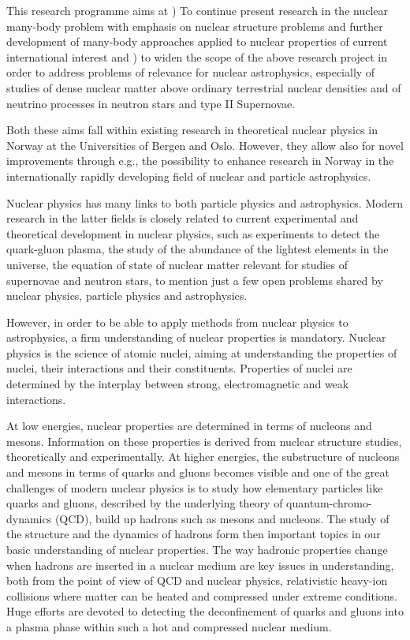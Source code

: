 This research programme aims at ) To continue present research in the nuclear many-body
problem with emphasis on nuclear structure problems
and further development of many-body approaches applied to nuclear
properties of current international interest
and ) to widen the scope of the above research project
in order to address 
problems of relevance for nuclear astrophysics, especially
of studies of dense nuclear matter above ordinary terrestrial 
nuclear densities and of neutrino processes in 
neutron stars and type II Supernovae. 

Both these aims fall within existing research in
theoretical nuclear physics in Norway at the Universities
of Bergen and Oslo. However, they allow also for novel  improvements
through e.g., the possibility
to  enhance 
research in Norway in the internationally rapidly 
developing field of nuclear and particle astrophysics.


Nuclear physics has many links to both particle physics
and astrophysics. 
Modern research in the latter fields is closely related
to current experimental and theoretical development
in nuclear physics, such as experiments to detect
the quark-gluon plasma, the study of the abundance of the 
lightest elements in the universe, the equation
of state of nuclear matter relevant for studies of supernovae
and neutron stars, to mention just a few open problems
shared by nuclear physics, particle physics and astrophysics.

However, in order to be able to apply 
methods from nuclear physics to astrophysics,
a firm understanding of nuclear properties is mandatory.
Nuclear physics is the science of atomic nuclei, aiming
at understanding the properties of nuclei, 
their interactions and 
their constituents. Properties of nuclei are determined
by the interplay between strong, electromagnetic and
weak interactions.

At low energies, nuclear properties are determined  
in terms of nucleons and mesons. Information on these
properties is derived from nuclear structure studies,
theoretically and experimentally. At higher energies,
the substructure of nucleons and mesons in terms of
quarks and gluons becomes visible and one of the great
challenges
of modern nuclear physics is to study how elementary particles
like quarks and gluons, described by the  underlying theory
of quantum-chromo-dynamics (QCD), build up hadrons such as mesons
and nucleons. The study of the structure and the 
dynamics of hadrons form then important topics in our basic
understanding of nuclear properties. The way hadronic 
properties change when hadrons are inserted in a nuclear
medium are key issues in understanding, both from
the point of view of QCD and nuclear physics, relativistic
heavy-ion collisions where matter can be heated and 
compressed under extreme conditions. Huge efforts are devoted to
detecting the deconfinement of quarks and gluons into a
plasma phase within such a hot and compressed nuclear medium.

